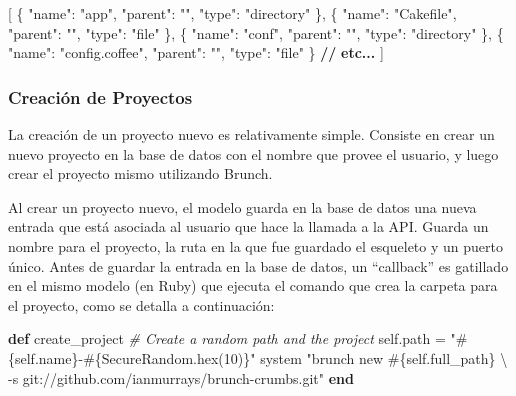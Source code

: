 \documentclass[12pt,spanish,letter]{report}
\newenvironment{Shaded}{}{}
\newcommand{\KeywordTok}[1]{\textcolor[rgb]{0.00,0.44,0.13}{\textbf{{#1}}}}
\newcommand{\DataTypeTok}[1]{\textcolor[rgb]{0.56,0.13,0.00}{{#1}}}
\newcommand{\DecValTok}[1]{\textcolor[rgb]{0.25,0.63,0.44}{{#1}}}
\newcommand{\StringTok}[1]{\textcolor[rgb]{0.25,0.44,0.63}{{#1}}}
\newcommand{\CommentTok}[1]{\textcolor[rgb]{0.38,0.63,0.69}{\textit{{#1}}}}
\newcommand{\OtherTok}[1]{\textcolor[rgb]{0.00,0.44,0.13}{{#1}}}
\newcommand{\ErrorTok}[1]{\textcolor[rgb]{1.00,0.00,0.00}{\textbf{{#1}}}}
\newcommand{\NormalTok}[1]{{#1}}
\begin{document}
\begin{Shaded}
\begin{Highlighting}[]
\NormalTok{[}
    \NormalTok{\{}
        \DataTypeTok{"name"}\NormalTok{: }\StringTok{"app"}\NormalTok{,}
        \DataTypeTok{"parent"}\NormalTok{: }\StringTok{""}\NormalTok{,}
        \DataTypeTok{"type"}\NormalTok{: }\StringTok{"directory"}
    \NormalTok{\},}
    \NormalTok{\{}
        \DataTypeTok{"name"}\NormalTok{: }\StringTok{"Cakefile"}\NormalTok{,}
        \DataTypeTok{"parent"}\NormalTok{: }\StringTok{""}\NormalTok{,}
        \DataTypeTok{"type"}\NormalTok{: }\StringTok{"file"}
    \NormalTok{\},}
    \NormalTok{\{}
        \DataTypeTok{"name"}\NormalTok{: }\StringTok{"conf"}\NormalTok{,}
        \DataTypeTok{"parent"}\NormalTok{: }\StringTok{""}\NormalTok{,}
        \DataTypeTok{"type"}\NormalTok{: }\StringTok{"directory"}
    \NormalTok{\},}
    \NormalTok{\{}
        \DataTypeTok{"name"}\NormalTok{: }\StringTok{"config.coffee"}\NormalTok{,}
        \DataTypeTok{"parent"}\NormalTok{: }\StringTok{""}\NormalTok{,}
        \DataTypeTok{"type"}\NormalTok{: }\StringTok{"file"}
    \NormalTok{\}}
    \ErrorTok{//} \ErrorTok{etc...}
\NormalTok{]}
\end{Highlighting}
\end{Shaded}

\subsubsection{Creación de Proyectos}

La creación de un proyecto nuevo es relativamente simple. Consiste en
crear un nuevo proyecto en la base de datos con el nombre que provee el
usuario, y luego crear el proyecto mismo utilizando Brunch.

Al crear un proyecto nuevo, el modelo guarda en la base de datos una
nueva entrada que está asociada al usuario que hace la llamada a la API.
Guarda un nombre para el proyecto, la ruta en la que fue guardado el
esqueleto y un puerto único. Antes de guardar la entrada en la base de
datos, un ``callback'' es gatillado en el mismo modelo (en Ruby) que
ejecuta el comando que crea la carpeta para el proyecto, como se detalla
a continuación:

\begin{Shaded}
\begin{Highlighting}[]
\KeywordTok{def} \NormalTok{create_project}
  \CommentTok{# Create a random path and the project}
  \DecValTok{self}\NormalTok{.path = }\StringTok{"}\OtherTok{#\{}\DecValTok{self}\NormalTok{.name}\OtherTok{\}}\StringTok{-}\OtherTok{#\{}\DataTypeTok{SecureRandom}\NormalTok{.hex(}\DecValTok{10}\NormalTok{)}\OtherTok{\}}\StringTok{"}
  \NormalTok{system }\StringTok{"brunch new }\OtherTok{#\{}\DecValTok{self}\NormalTok{.full_path}\OtherTok{\}}\StringTok{ \textbackslash{}}
\StringTok{          -s git://github.com/ianmurrays/brunch-crumbs.git"}
\KeywordTok{end}
\end{Highlighting}
\end{Shaded}
\end{document}
